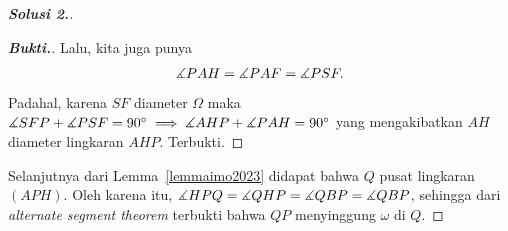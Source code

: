 \begin{proof}[\textbf{Solusi 2.}]
\begin{lemmarev}
\begin{proof}[\textbf{Bukti.}]
            Lalu, kita juga punya
            \begin{align*}
                \measuredangle PAH = \measuredangle PAF = \measuredangle PSF.
            \end{align*}
            Padahal, karena $SF$ diameter $\Omega$ maka $\measuredangle SFP + \measuredangle PSF = 90^\circ \implies \measuredangle AHP + \measuredangle PAH = 90^\circ$ yang mengakibatkan $AH$ diameter lingkaran $AHP$. Terbukti.
        \end{proof}
    \end{lemmarev}
    Selanjutnya dari Lemma~\ref{lemmaimo2023} didapat bahwa $Q$ pusat lingkaran $(APH)$. Oleh karena itu, $\measuredangle HPQ = \measuredangle QHP = \measuredangle QBP = \measuredangle QBP$, sehingga dari \textit{alternate segment theorem} terbukti bahwa $QP$ menyinggung $\omega$ di $Q$.
\end{proof} 